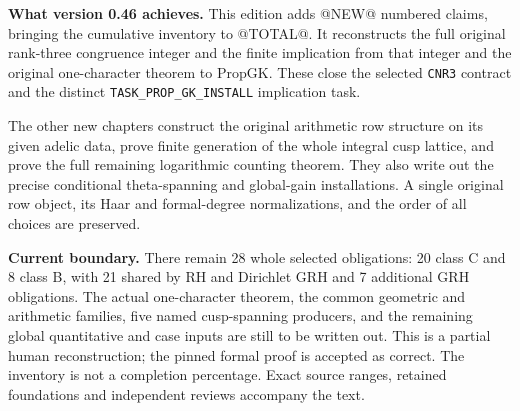 \textbf{What version 0.46 achieves.}
This edition adds @NEW@ numbered claims, bringing the cumulative inventory
to @TOTAL@. It reconstructs the full original rank-three congruence integer
and the finite implication from that integer and the original
one-character theorem to \(\mathrm{PropGK}\). These close the selected
\texttt{CNR3} contract and the distinct
\texttt{TASK\_PROP\_GK\_INSTALL} implication task.

The other new chapters construct the original arithmetic row structure
on its given adelic data, prove finite generation of the whole integral
cusp lattice, and prove the full remaining logarithmic counting theorem.
They also write out the precise conditional theta-spanning and global-gain
installations. A single original row object, its Haar and formal-degree
normalizations, and the order of all choices are preserved.

\textbf{Current boundary.}
There remain 28 whole selected obligations: 20 class C and 8 class B,
with 21 shared by RH and Dirichlet GRH and 7 additional GRH obligations.
The actual one-character theorem, the common geometric and arithmetic
families, five named cusp-spanning producers, and the remaining global
quantitative and case inputs are still to be written out. This is a
partial human reconstruction; the pinned formal proof is accepted as
correct. The inventory is not a completion percentage. Exact source
ranges, retained foundations and independent reviews accompany the text.

